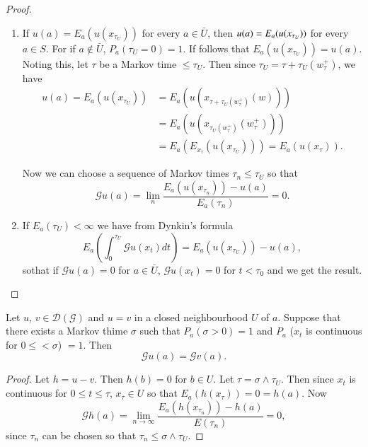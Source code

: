 \begin{proof}
\begin{enumerate}
\renewcommand{\labelenumi}{(\theenumi)}
\item If $u(a) = E_a (u (x_{\tau_U}))$ for every $a \in
  \bar{U}$, then $u(a) = E_a\break (u(x_{\tau_U}))$ for every $a
  \in S$. For if $a \notin \bar{U}$, $P_a (\tau_U = 0) =
  1$. If follows that $E_a (u(x_{\tau_U})) = u(a)$. Noting this,
  let $\tau$ be a Markov time $\leq \tau_U$. Then since $\tau_U =
  \tau + \tau_U (w^+_\tau)$, we have 
\begin{align*}
u (a) = E_a (u (x_{\tau_U})) & = E_a (u(x_{\tau + \tau_U (w^+_\tau)} (w)))\\
& = E_a (u (x_{\tau_U(w^+_\tau)} (w^+_\tau)))\\
& = E_a (E_{x_\tau} (u(x_{\tau_U}))) = E_a (u (x_\tau)).
  \end{align*} 

Now we can choose a sequence of Markov times $\tau_n \leq \tau_U$ so
that  
$$
\mathscr{G} u (a) = \lim_n \frac{E_a (u(x_{\tau_n})) - u(a)} {E_a
  (\tau_n)} = 0. 
$$

\item If $E_a(\tau_U) < \infty$ we have from Dynkin's formula
$$
E_a \left(\int^{\tau_U}_0 \mathscr{G} u (x_t) dt\right) = E_a
(u(x_{\tau_U})) -u(a), 
$$
so\pageoriginale that if $\mathscr{G} u (a) = 0$ for $a \in
\bar{U}$, $\mathscr{G} u (x_t) = 0$ for $t < \tau_0$ and we get the
result. 
\end{enumerate}
\end{proof}

\begin{thm}\label{chap2-sec9-thm13}%
  Let $u$, $v \in \mathscr{D} (\mathscr{G})$ and $u =v$ in a
  closed neighbourhood $U$ of $a$. Suppose that there exists a Markov
  thime $\sigma$ such that  $P_a (\sigma > 0) = 1$ and $P_a$ ($x_t$ is
  continuous for $0 \le < \sigma$) $=1$. Then 
  $$
  \mathscr{G} u (a) = \mathscr{G} v (a).
  $$
\end{thm}

\begin{proof}
  Let $h =u-v$. Then $h (b) = 0$ for $b \in U$. Let $\tau=
  \sigma \wedge \tau_U$. Then since $x_t$ is continuous for $0 \leq
  t \leq \tau$, $x_\tau \in U$ so that  $E_a (h (x_\tau)) = 0 = h
  (a)$. Now 
$$
\mathscr{G} h (a) = \lim_{n \to \infty} \frac{E_a (h (x_{\tau_n}))
    - h (a)}{E(\tau_n)} =0, 
$$
since $\tau_n$ can be chosen so that $\tau_n \le \sigma \wedge \tau_U$. 
\end{proof}
